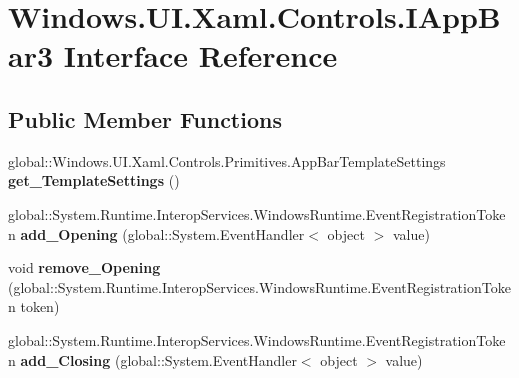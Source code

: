 \hypertarget{interface_windows_1_1_u_i_1_1_xaml_1_1_controls_1_1_i_app_bar3}{}\section{Windows.\+U\+I.\+Xaml.\+Controls.\+I\+App\+Bar3 Interface Reference}
\label{interface_windows_1_1_u_i_1_1_xaml_1_1_controls_1_1_i_app_bar3}
\subsection*{Public Member Functions}
\begin{DoxyCompactItemize}
\item 
\mbox{\label{interface_windows_1_1_u_i_1_1_xaml_1_1_controls_1_1_i_app_bar3_a890144dceae211eb8ad8f8f7a8bea0d8}} 
global\+::\+Windows.\+U\+I.\+Xaml.\+Controls.\+Primitives.\+App\+Bar\+Template\+Settings {\bfseries get\+\_\+\+Template\+Settings} ()
\item 
\mbox{\label{interface_windows_1_1_u_i_1_1_xaml_1_1_controls_1_1_i_app_bar3_a62cddde1b89907b6b31a54a5172b02d5}} 
global\+::\+System.\+Runtime.\+Interop\+Services.\+Windows\+Runtime.\+Event\+Registration\+Token {\bfseries add\+\_\+\+Opening} (global\+::\+System.\+Event\+Handler$<$ object $>$ value)
\item 
\mbox{\label{interface_windows_1_1_u_i_1_1_xaml_1_1_controls_1_1_i_app_bar3_afaabe37e022a635508e675aa7ef0974c}} 
void {\bfseries remove\+\_\+\+Opening} (global\+::\+System.\+Runtime.\+Interop\+Services.\+Windows\+Runtime.\+Event\+Registration\+Token token)
\item 
\mbox{\label{interface_windows_1_1_u_i_1_1_xaml_1_1_controls_1_1_i_app_bar3_a6e424fac8c7cec71bad623c7c5e8ebd3}} 
global\+::\+System.\+Runtime.\+Interop\+Services.\+Windows\+Runtime.\+Event\+Registration\+Token {\bfseries add\+\_\+\+Closing} (global\+::\+System.\+Event\+Handler$<$ object $>$ value)
\item 
\mbox{\label{interface_windows_1_1_u_i_1_1_xaml_1_1_controls_1_1_i_app_bar3_aac12730dbba64fc7499059fd3646d24d}} 

\end{DoxyCompactItemize}
